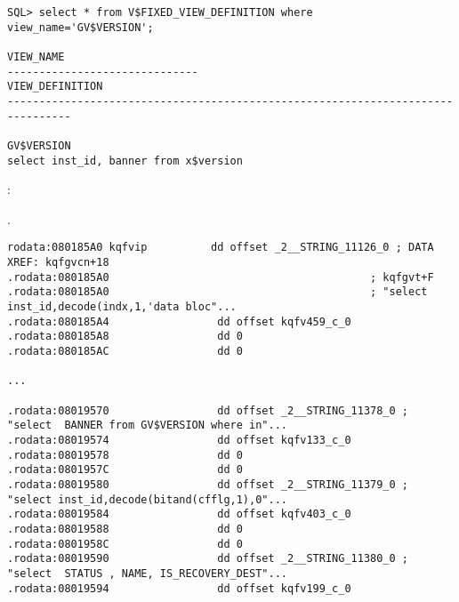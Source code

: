 
\begin{lstlisting}
SQL> select * from V$FIXED_VIEW_DEFINITION where view_name='GV$VERSION';

VIEW_NAME
------------------------------
VIEW_DEFINITION
--------------------------------------------------------------------------------

GV$VERSION
select inst_id, banner from x$version
\end{lstlisting}


  :

.\begin{lstlisting}
rodata:080185A0 kqfvip          dd offset _2__STRING_11126_0 ; DATA XREF: kqfgvcn+18
.rodata:080185A0                                         ; kqfgvt+F
.rodata:080185A0                                         ; "select inst_id,decode(indx,1,'data bloc"...
.rodata:080185A4                 dd offset kqfv459_c_0
.rodata:080185A8                 dd 0
.rodata:080185AC                 dd 0

...

.rodata:08019570                 dd offset _2__STRING_11378_0 ; "select  BANNER from GV$VERSION where in"...
.rodata:08019574                 dd offset kqfv133_c_0
.rodata:08019578                 dd 0
.rodata:0801957C                 dd 0
.rodata:08019580                 dd offset _2__STRING_11379_0 ; "select inst_id,decode(bitand(cfflg,1),0"...
.rodata:08019584                 dd offset kqfv403_c_0
.rodata:08019588                 dd 0
.rodata:0801958C                 dd 0
.rodata:08019590                 dd offset _2__STRING_11380_0 ; "select  STATUS , NAME, IS_RECOVERY_DEST"...
.rodata:08019594                 dd offset kqfv199_c_0
\end{lstlisting}

